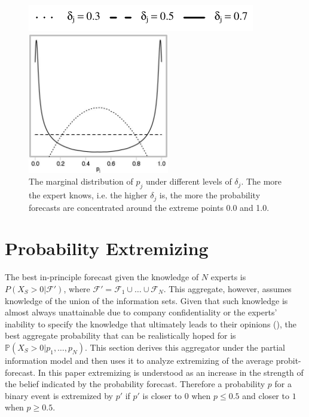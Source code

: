 \documentclass[11pt]{article}
\renewcommand{\P}{\mathbb{P}}
\theoremstyle{definition}
\theoremstyle{definition}
\begin{document}
\begin{figure}[t]
\centering
	\hspace{0em}\includegraphics{LegendMarginal}

 \includegraphics[width= 0.55\textwidth]{Marginals}
   \caption{The marginal distribution of $p_j$ under different levels of $\delta_j$. The more the expert knows, i.e. the higher $\delta_j$ is, the more the probability forecasts are concentrated around the extreme points 0.0 and 1.0.}
\label{marginals}
\end{figure}


\section{Probability Extremizing}
\label{extremizing}
The best in-principle forecast given the knowledge of $N$ experts is $P(X_{S} > 0 |  \mathcal{F}')$, where $\mathcal{F}' = \mathcal{F}_1 \cup \dots \cup \mathcal{F}_N$. This aggregate, however, assumes knowledge of the union of the information sets. Given that such knowledge is almost always unattainable due to company confidentiality or the experts' inability to specify the knowledge that ultimately leads to their opinions (\cite{dawid1995coherent}), the best aggregate probability that can be realistically hoped for is  $\P(X_{S} > 0 | p_1, \dots, p_N)$. This section derives this aggregator under the partial information model and then uses it to analyze extremizing of the average probit-forecast.  In this paper extremizing is understood as an increase in the strength of the belief indicated by the probability forecast. Therefore a probability $p$ for a binary event is extremized by $p'$ if $p'$ is closer to $0$ when $p \leq 0.5$ and closer to $1$ when $p \geq 0.5$.  
\end{document}
